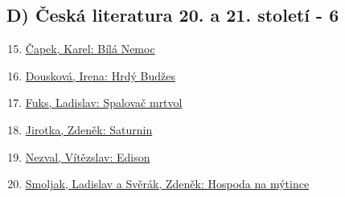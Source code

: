 \documentclass[a4paper,11pt]{article}
\begin{document}
\subsection*{D)	Česká literatura 20. a 21. století - 6}
\begin{enumerate}
    \setcounter{enumi}{14}
    \item \hyperref[sec:bilanemoc]{Čapek, Karel: Bílá Nemoc}
    \item \hyperref[sec:hrdybudzes]{Dousková, Irena: Hrdý Budžes}
    \item \hyperref[sec:spalovacmrtvol]{Fuks, Ladislav: Spalovač mrtvol}
    \item \hyperref[sec:saturnin]{Jirotka, Zdeněk: Saturnin}
    \item \hyperref[sec:edison]{Nezval, Vítězslav: Edison}
    \item \hyperref[sec:hospodanamytince]{Smoljak, Ladislav a Svěrák, Zdeněk: Hospoda na mýtince}
\end{enumerate}















\end{document}
